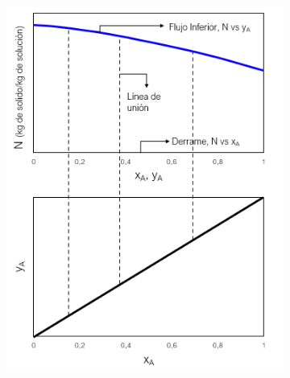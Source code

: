 \documentclass[11pt]{book}
\begin{document}
\begin{figure}[H]
  \begin{subfigure}[b]{0.45\textwidth}
    \includegraphics[width=\textwidth]{img/lixiviacion/EquilibrioLixiviacion_1.PNG}
    \caption{ }
    \label{Fig:Lixiviacion_2}
  \end{subfigure}
  \hfill
  \begin{subfigure}[b]{0.45\textwidth}

\end{subfigure}
\end{figure}
\end{document}
